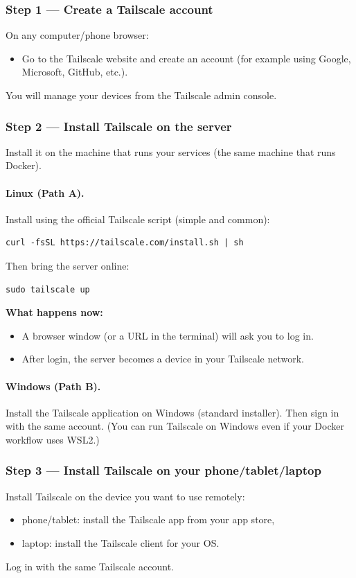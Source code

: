 \subsubsection*{Step 1 --- Create a Tailscale account}
On any computer/phone browser:
\begin{itemize}[leftmargin=*]
  \item Go to the Tailscale website and create an account (for example using Google, Microsoft, GitHub, etc.).
\end{itemize}
You will manage your devices from the Tailscale admin console.

\subsubsection*{Step 2 --- Install Tailscale on the server}
Install it on the machine that runs your services (the same machine that runs Docker).

\paragraph{Linux (Path A).}
Install using the official Tailscale script (simple and common):
\begin{lstlisting}
curl -fsSL https://tailscale.com/install.sh | sh
\end{lstlisting}

Then bring the server online:
\begin{lstlisting}
sudo tailscale up
\end{lstlisting}

\textbf{What happens now:}
\begin{itemize}[leftmargin=*]
  \item A browser window (or a URL in the terminal) will ask you to log in.
  \item After login, the server becomes a device in your Tailscale network.
\end{itemize}

\paragraph{Windows (Path B).}
Install the Tailscale application on Windows (standard installer).
Then sign in with the same account.
(You can run Tailscale on Windows even if your Docker workflow uses WSL2.)

\subsubsection*{Step 3 --- Install Tailscale on your phone/tablet/laptop}
Install Tailscale on the device you want to use remotely:
\begin{itemize}[leftmargin=*]
  \item phone/tablet: install the Tailscale app from your app store,
  \item laptop: install the Tailscale client for your OS.
\end{itemize}
Log in with the same Tailscale account.

